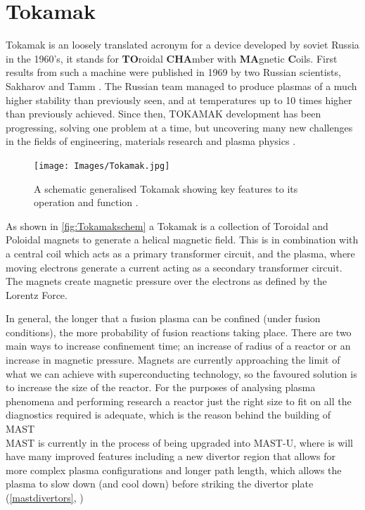 \documentclass[12pt,a4paper,oneside]{report}
\begin{document}
	\section{Tokamak}
Tokamak is an loosely translated acronym for a device developed by soviet Russia in the 1960's, it stands for \textbf{TO}roidal \textbf{CHA}mber with \textbf{MA}gnetic \textbf{C}oils. First results from such a machine were published in 1969 by two Russian scientists, Sakharov and Tamm \cite{Tamm1959TheoryI}. The Russian team managed to produce plasmas of a much higher stability than previously seen, and at temperatures up to 10 times higher than previously achieved. Since then, TOKAMAK development has been progressing, solving one problem at a time, but uncovering many new challenges in the fields of engineering, materials research and plasma physics \cite{Smirnov2010Tokamak19501990}.\\

\begin{figure}[H]
\texttt{[image: Images/Tokamak.jpg]}
\caption{A schematic generalised Tokamak showing key features to its operation and function \cite{TokamakEUROfusion}.}
\label{fig:Tokamakschem}
\end{figure}

As shown in \autoref{fig:Tokamakschem} a Tokamak is a collection of Toroidal and Poloidal magnets to generate a helical magnetic field. This is in combination with a central coil which acts as a primary transformer circuit, and the plasma, where moving electrons generate a current acting as a secondary transformer circuit. The magnets create magnetic pressure over the electrons as defined by the Lorentz Force.

In general, the longer that a fusion plasma can be confined (under fusion conditions), the more probability of fusion reactions taking place. There are two main ways to increase confinement time; an increase of radius of a reactor or an increase in magnetic pressure. Magnets are currently approaching the limit of what we can achieve with superconducting technology, so the favoured solution is to increase the size of the reactor. For the purposes of analysing plasma phenomena and performing research a reactor just the right size to fit on all the diagnostics required is adequate, which is the reason behind the building of MAST \cite{Chapman2015OverviewResults}\\

MAST is currently in the process of being upgraded into MAST-U, where is will have many improved features including a new divertor region that allows for more complex plasma configurations and longer path length, which allows the plasma to slow down (and cool down) before striking the divertor plate (\autoref{mastdivertors}, \cite{CulhamCenterforFusionEnergyResearch:Upgrade})
\end{document}
